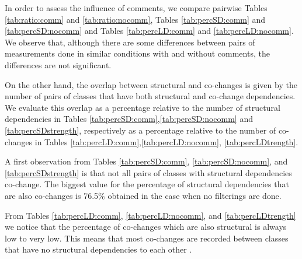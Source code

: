 \documentclass[12pt, a4paper, twoside]{report}
\begin{document}
\begin{table}[!h]
\renewcommand{\arraystretch}{1}
\caption{Percentage of co-changing pairs that are SD after connection strength filtering. }
\label{tab:percLDtrength}
\centering
{}
\end{table}

In order to assess the influence of comments, we compare pairwise Tables \ref{tab:ratio:comm} and \ref{tab:ratio:nocomm},  
Tables \ref{tab:percSD:comm} and \ref{tab:percSD:nocomm} and Tables \ref{tab:percLD:comm} and \ref{tab:percLD:nocomm}. 
We observe that, although there are some differences between pairs of measurements done in similar conditions with and without comments, the differences are not significant.

On the other hand, the overlap between structural and co-changes is given by the number of pairs of classes that have both structural and co-change dependencies. We evaluate this overlap as a percentage relative to the number of structural dependencies in Tables \ref{tab:percSD:comm},\ref{tab:percSD:nocomm} and \ref{tab:percSDstrength}, respectively as a percentage relative to the number of co-changes in Tables \ref{tab:percLD:comm},\ref{tab:percLD:nocomm}, \ref{tab:percLDtrength}.

A first observation from Tables \ref{tab:percSD:comm}, \ref{tab:percSD:nocomm}, and \ref{tab:percSDstrength} is that not all pairs of classes with structural dependencies co-change. The biggest value for the percentage of structural dependencies that are also co-changes is 76.5\% obtained in the case when no filterings are done.

From Tables \ref{tab:percLD:comm}, \ref{tab:percLD:nocomm}, and \ref{tab:percLDtrength} we notice that the percentage of co-changes which are also structural is always low to very low. This means that most co-changes are recorded between classes that have no structural dependencies to each other \cite{enase19}.   
 
\end{document}
